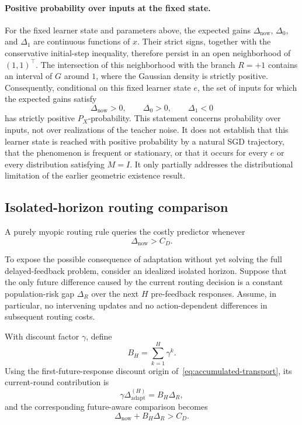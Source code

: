 \paragraph{Positive probability over inputs at the fixed state.}
For the fixed learner state and parameters above, the expected gains
$\Delta_{\mathrm{now}}$, $\Delta_0$, and $\Delta_1$ are continuous
functions of $x$. Their strict signs, together with the conservative
initial-step inequality, therefore persist in an open neighborhood of
$(1,1)^\top$. The intersection of this neighborhood with the branch
$R=+1$ contains an interval of $G$ around $1$, where the Gaussian density
is strictly positive. Consequently, conditional on this fixed learner
state $e$, the set of inputs for which the expected gains satisfy
\begin{equation}
    \Delta_{\mathrm{now}}>0,\qquad
    \Delta_0>0,\qquad
    \Delta_1<0
\end{equation}
has strictly positive $P_X$-probability. This statement concerns
probability over inputs, not over realizations of the teacher noise.
It does not establish that this learner state is reached with positive
probability by a natural SGD trajectory, that the phenomenon is frequent
or stationary, or that it occurs for every $e$ or every distribution
satisfying $M=I$. It only partially addresses the distributional
limitation of the earlier geometric existence result.

\subsection{Isolated-horizon routing comparison}

A purely myopic routing rule queries the costly predictor whenever
\begin{equation}
    \Delta_{\mathrm{now}}>C_D.
    \label{eq:myopic-rule}
\end{equation}

To expose the possible consequence of adaptation without yet solving the
full delayed-feedback problem, consider an idealized isolated horizon.
Suppose that the only future difference caused by the current routing
decision is a constant population-risk gap $\Delta_R$ over the next $H$
pre-feedback responses. Assume, in particular, no intervening updates and
no action-dependent differences in subsequent routing costs.

With discount factor $\gamma$, define
\begin{equation}
    B_H=\sum_{k=1}^{H}\gamma^k.
\end{equation}
Using the first-future-response discount origin
of~\eqref{eq:accumulated-transport}, its current-round contribution is
\begin{equation}
    \gamma\Delta_{\mathrm{adapt}}^{(H)}
    =B_H\Delta_R,
\end{equation}
and the corresponding future-aware comparison becomes
\begin{equation}
    \Delta_{\mathrm{now}}+B_H\Delta_R>C_D.
    \label{eq:isolated-rule}
\end{equation}

